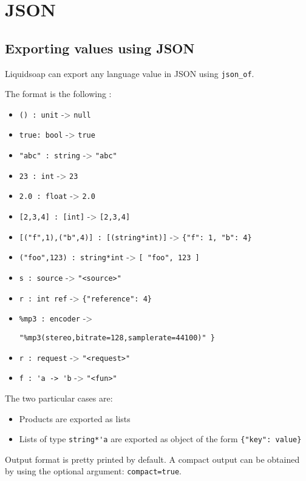 \section{JSON}
\subsection{Exporting values using JSON}
Liquidsoap can export any language value in JSON using
\verb+json_of+.

The format is the following :

\begin{itemize}
\item \verb+() : unit+ -> \verb+null+
\item \verb+true: bool+ -> \verb+true+
\item \verb+"abc" : string+ -> \verb+"abc"+
\item \verb+23 : int+ -> \verb+23+
\item \verb+2.0 : float+ -> \verb+2.0+
\item \verb+[2,3,4] : [int]+ -> \verb+[2,3,4]+
\item \verb+[("f",1),("b",4)] : [(string*int)]+ -> \verb+{"f": 1, "b": 4}+
\item \verb+("foo",123) : string*int+ -> \verb+[ "foo", 123 ]+
\item \verb+s : source+ -> \verb+"<source>"+
\item \verb+r : int ref+ -> \verb+{"reference": 4}+
\item \verb+%mp3 : encoder+ ->
\begin{verbatim}
"%mp3(stereo,bitrate=128,samplerate=44100)" }
\end{verbatim}

\item \verb+r : request+ -> \verb+"<request>"+
\item \verb+f : 'a -> 'b+ -> \verb+"<fun>"+

\end{itemize}
The two particular cases are:

\begin{itemize}
\item Products are exported as lists
\item Lists of type \verb+string*'a+ are exported as object of the form
  \verb+{"key": value}+

\end{itemize}
Output format is pretty printed by default. A compact output can
be obtained by using the optional argument: \verb+compact=true+.

